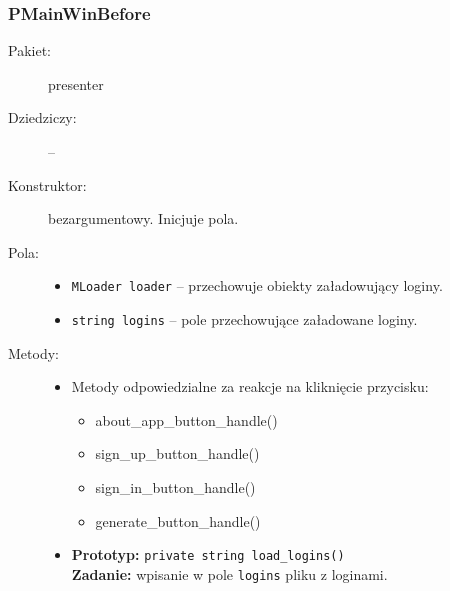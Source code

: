\documentclass[a4paper]{article}
\newcommand{\prog}{\texttt}
\begin{document}
\subsubsection{PMainWinBefore}
\begin{description}
    \item[Pakiet:] presenter
    \item[Dziedziczy:] --
    \item[Konstruktor:] bezargumentowy. Inicjuje pola.
    \item[Pola:] \hfill
    \begin{itemize}
        \item \prog{MLoader loader} -- przechowuje obiekty załadowujący loginy.
        \item \prog{string logins} -- pole przechowujące załadowane loginy.
    \end{itemize}
    \item[Metody:] \hfill
    \begin{itemize}
        \item Metody odpowiedzialne za reakcje na kliknięcie przycisku:
        \begin{itemize}
            \item about\_app\_button\_handle()
            \item sign\_up\_button\_handle()
            \item sign\_in\_button\_handle()
            \item generate\_button\_handle()
        \end{itemize}
        \item \textbf{Prototyp:} \prog{private string load\_logins()}\\\textbf{Zadanie:} wpisanie w pole \prog{logins} pliku z loginami.
    \end{itemize}
\end{description}
\end{document}
